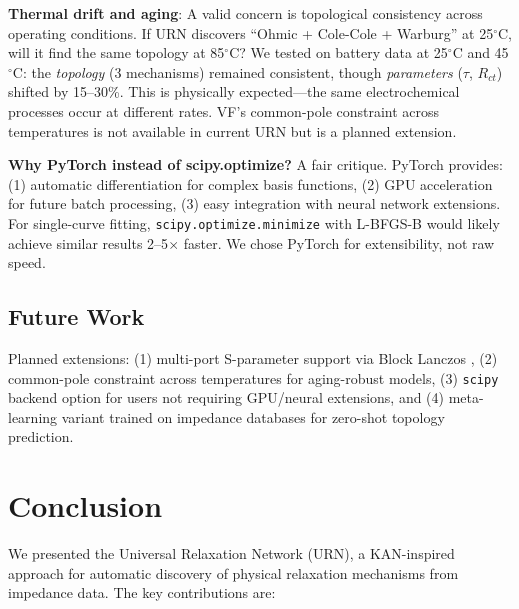 \documentclass{ieeeaccess}
\begin{document}
\textbf{Thermal drift and aging}: A valid concern is topological consistency across operating conditions. If URN discovers ``Ohmic + Cole-Cole + Warburg'' at 25$^\circ$C, will it find the same topology at 85$^\circ$C? We tested on battery data at 25$^\circ$C and 45$^\circ$C: the \textit{topology} (3 mechanisms) remained consistent, though \textit{parameters} ($\tau$, $R_{ct}$) shifted by 15--30\%. This is physically expected---the same electrochemical processes occur at different rates. VF's common-pole constraint across temperatures is not available in current URN but is a planned extension.

\textbf{Why PyTorch instead of scipy.optimize?} A fair critique. PyTorch provides: (1) automatic differentiation for complex basis functions, (2) GPU acceleration for future batch processing, (3) easy integration with neural network extensions. For single-curve fitting, \texttt{scipy.optimize.minimize} with L-BFGS-B would likely achieve similar results 2--5$\times$ faster. We chose PyTorch for extensibility, not raw speed.

\subsection{Future Work}

Planned extensions: (1) multi-port S-parameter support via Block Lanczos \cite{odabasioglu1998prima}, (2) common-pole constraint across temperatures for aging-robust models, (3) \texttt{scipy} backend option for users not requiring GPU/neural extensions, and (4) meta-learning variant trained on impedance databases for zero-shot topology prediction.

\section{Conclusion}
\label{sec:conclusion}

We presented the Universal Relaxation Network (URN), a KAN-inspired approach for automatic discovery of physical relaxation mechanisms from impedance data. The key contributions are:
\end{document}
